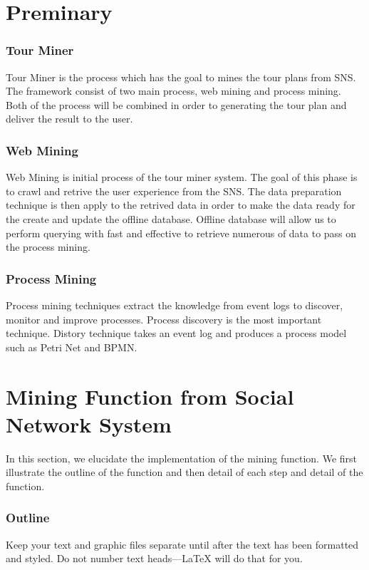 \documentclass[conference]{IEEEtran}
\begin{document}
\section{Preminary}


\subsubsection{Tour Miner} Tour Miner is the process which has the goal to mines the tour plans from SNS. The framework consist of two main process, web mining  and process mining. Both of the process will be combined in order to generating the tour plan and deliver the result to the user.

\subsubsection{Web Mining} Web Mining is initial process of the tour miner system. The goal of this phase is to crawl and retrive the user experience from the SNS. The data preparation technique is then apply to the retrived data in order to make the data ready for the create and update the offline database. Offline database will allow us to perform querying with fast and effective to retrieve numerous of data to pass on the process mining.


\subsubsection{Process Mining}  Process mining techniques extract the knowledge from event logs to discover, monitor and improve processes. Process discovery is the most important technique. Distory technique takes an event log and produces a process model such as Petri Net and BPMN.


\section{Mining Function from Social Network System}

In this section, we elucidate the implementation of the mining function. We first illustrate the outline of the function and then detail of each step and detail of the function.

\subsubsection{Outline} 

Keep your text and graphic files separate until after the text has been 
formatted and styled. Do not number text heads---{\LaTeX} will do that 
for you.
\end{document}
